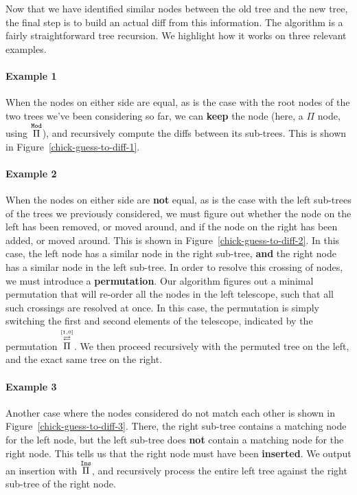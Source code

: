 

Now that we have identified similar nodes between the old tree and the new tree,
the final step is to build an actual diff from this information.  The algorithm
is a fairly straightforward tree recursion.  We highlight how it works on three
relevant examples.

\paragraph{Example 1} When the nodes on either side are equal, as is the case
with the root nodes of the two trees we've been considering so far, we can
\textbf{keep} the node (here, a $\Pi$ node, using $\overset{\mathtt{Mod}}{\Pi}{}$), and
recursively compute the diffs between its sub-trees.  This is shown in
Figure~\ref{chick-guess-to-diff-1}.



\paragraph{Example 2} When the nodes on either side are \textbf{not} equal, as
is the case with the left sub-trees of the trees we previously considered, we
must figure out whether the node on the left has been removed, or moved around,
and if the node on the right has been added, or moved around.  This is shown in
Figure~\ref{chick-guess-to-diff-2}.  In this case, the left node has a similar
node in the right sub-tree, \textbf{and} the right node has a similar node in
the left sub-tree.  In order to resolve this crossing of nodes, we must
introduce a \textbf{permutation}.  Our algorithm figures out a minimal
permutation that will re-order all the nodes in the left telescope, such that
all such crossings are resolved at once.  In this case, the permutation is
simply switching the first and second elements of the telescope, indicated by
the permutation $\MathPermutePis{[1, 0]}$.  We then proceed recursively with the
permuted tree on the left, and the exact same tree on the right.



\paragraph{Example 3} Another case where the nodes considered do not match each
other is shown in Figure~\ref{chick-guess-to-diff-3}.  There, the right sub-tree
contains a matching node for the left node, but the left sub-tree does
\textbf{not} contain a matching node for the right node.  This tells us that the
right node must have been \textbf{inserted}.  We output an insertion with
$\overset{\mathtt{Ins}}{\Pi}{}$, and recursively process the entire left tree against the right
sub-tree of the right node.

